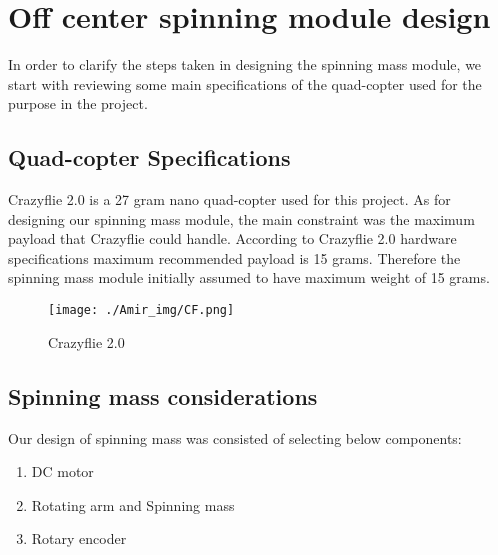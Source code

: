 \section{Off center spinning module design}
In order to clarify the steps taken in designing the spinning mass module, we start with reviewing some main specifications of the quad-copter used for the purpose in the project.
\subsection{Quad-copter Specifications}
Crazyflie 2.0 is a 27 gram nano quad-copter used for this project. As for designing our spinning mass module, the main constraint was the maximum payload that Crazyflie could handle. According to Crazyflie 2.0 hardware specifications maximum recommended payload is 15 grams. Therefore the spinning mass module initially assumed to have maximum weight of 15 grams.
\begin{figure}[h]
\centering
\texttt{[image: ./Amir\_img/CF.png]}
\caption{Crazyflie 2.0}
\end{figure}

\subsection{Spinning mass considerations}
Our design of spinning mass was consisted of selecting below components:
\begin{enumerate}
  \item DC motor
  \item Rotating arm and Spinning mass
  \item Rotary encoder 
\end{enumerate}
